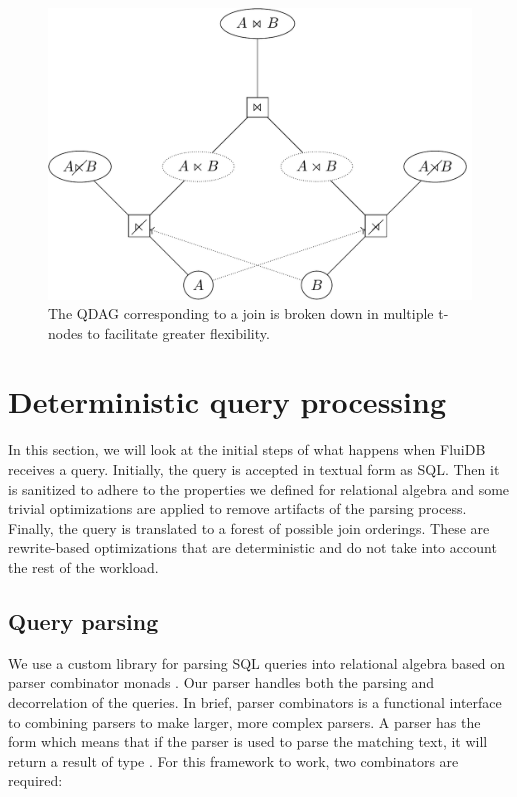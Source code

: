 \begin{figure}[H]
  \centering
  \includegraphics[width=.9\linewidth]{./imgs/joinnetdir.pdf}
  \caption{\label{fig:joinnetdir}The QDAG corresponding to a join is
    broken down in multiple t-nodes to facilitate greater
    flexibility.}
\end{figure}

\section{Deterministic query processing}
\label{sec:query_processing}

In this section, we will look at the initial steps of what happens
when FluiDB receives a query. Initially, the query is accepted in
textual form as SQL. Then it is sanitized to adhere to the properties
we defined for relational algebra and some trivial optimizations are
applied to remove artifacts of the parsing process. Finally, the query
is translated to a forest of possible join orderings. These are
rewrite-based optimizations that are deterministic and do not take
into account the rest of the workload.

\subsection{Query parsing}
\label{sec:query_parsing}

We use a custom library for parsing SQL queries into relational
algebra based on parser combinator monads
\cite{leijenParsecDirectStyle}. Our parser handles both the parsing
and decorrelation of the queries. In brief, parser combinators is a
functional interface to combining parsers to make larger, more complex parsers. A
parser  has the form  which means that if the parser
is used to parse the matching text, it will return a result of type
. For this framework to work, two combinators are required:

